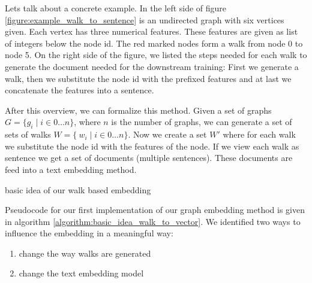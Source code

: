 Lets talk about a concrete example. In the left side of figure \ref{figure:example_walk_to_sentence} is an undirected graph with six vertices given. Each vertex has three numerical features. These features are given as list of integers below the node id. The red marked nodes form a walk from node 0 to node 5. On the right side of the figure, we listed the steps needed for each walk to generate the document needed for the downstream training: First we generate a walk, then we substitute the node id with the prefixed features and at last we concatenate the features into a sentence.

After this overview, we can formalize this method. Given a set of graphs $G = \{g_i \mid i \in 0 \dots n \}$, where $n$ is the number of graphs, we can generate a set of sets of walks $W = \{\ w_i \mid i \in 0 \dots n  \}$. Now we create a set $W'$ where for each walk we substitute the node id with the features of the node. If we view each walk as sentence we get a set of documents (multiple sentences). These documents are feed into a text embedding method.

\begin{minipage}{\linewidth}
    \begin{algorithm}[H]
        \DontPrintSemicolon



        \caption{basic idea of our walk based embedding}
        \label{algorithm:basic_idea_walk_to_vector}
    \end{algorithm}
\end{minipage}

Pseudocode for our first implementation of our graph embedding method is given in algorithm \ref{algorithm:basic_idea_walk_to_vector}. We identified two ways to influence the embedding in a meaningful way:
\begin{enumerate}
    \item
     change the way walks are generated

    \item
     change the text embedding model
\end{enumerate}

